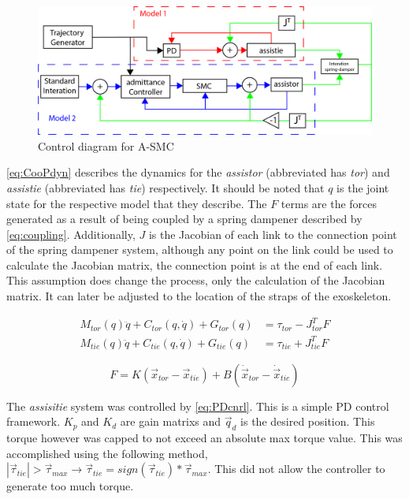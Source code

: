 \begin{figure}
    \centering
    \includegraphics[width=\linewidth]{images/controllers/SMC_control_diagram_overview.png}
    \caption[Control diagram for A-SMC]{Control diagram for A-SMC}
    \label{fig:controlDiagram}
\end{figure}

\autoref{eq:CooPdyn} describes the dynamics for the \textit{assistor} (abbreviated has \textit{tor}) and \textit{assistie} (abbreviated has \textit{tie}) respectively.  It should be noted that $q$ is the joint state for the respective model that they describe. The $F$ terms are the forces generated as a result of being coupled by a spring dampener described by \autoref{eq:coupling}. Additionally, $J$ is the Jacobian of each link to the connection point of the spring dampener system, although any point on the link could be used to calculate the Jacobian matrix, the connection point is at the end of each link. This assumption does change the process, only the calculation of the Jacobian matrix. It can later be adjusted to the location of the straps of the exoskeleton.

\begin{equation} 
\begin{aligned}
    M_{tor}(q) \ddot{q} + C_{tor} (q,\dot{q}) + G_{tor}(q) &= \tau_{tor} - J_{tor}^T F \\
    M_{tie}(q) \ddot{q} + C_{tie} (q,\dot{q}) + G_{tie}(q) &= \tau_{tie} + J_{tie}^T F
\end{aligned}
    \label{eq:CooPdyn}
\end{equation}

\begin{equation}
    F = K ( \vec{x}_{tor} - \vec{x}_{tie} ) + B (\dot{ \vec{x}}_{tor} - \dot{ \vec{x}}_{tie} ) 
    \label{eq:coupling}
\end{equation}


The \textit{assisitie} system was controlled by \autoref{eq:PDcnrl}. This is a simple PD control framework. $K_p$ and $K_d$ are gain matrixs and $\vec{q}_d$ is the desired position. This torque however was capped to not exceed an absolute max torque value. This was accomplished using the following method, $| \vec{\tau}_{tie}|> \vec{\tau}_{max} \rightarrow \vec{\tau}_{tie} = sign(\vec{\tau}_{tie})*\vec{\tau}_{max}$.  This did not allow the controller to generate too much torque. 

